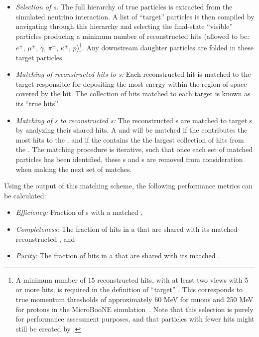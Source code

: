 \begin{itemize}
\item \textit{Selection of s:} The full hierarchy of true particles is extracted from the simulated neutrino interaction. A list of ``target'' particles is then compiled by navigating through this hierarchy and selecting the final-state ``visible'' particles producing a minimum number of reconstructed hits (allowed to be: $e^{\pm}$, $\mu^{\pm}$, $\gamma$, $\pi^{\pm}$, $\kappa^{\pm}$, $p$)\footnote{A minimum number of 15 reconstructed hits, with at least two views with 5 or more hits, is required in the definition of ``target'' . This  corresponds to true momentum thresholds of approximately 60 MeV for muons and 250 MeV for protons in the MicroBooNE simulation~\cite{Acciarri:2017hat}. Note that this selection is purely for performance assessment purposes, and that particles with fewer hits might still be created by .}. Any downstream daughter particles are folded in these target particles.
\item \textit{Matching of reconstructed \twod hits to s:} Each reconstructed \twod hit is matched to the target  responsible for depositing the most energy within the region of space covered by the hit. The collection of \twod hits matched to each target  is known as its ``true hits''.
\item \textit{Matching of s to reconstructed s:} The reconstructed s are matched to target s by analyzing their shared \twod hits. A  and  will be matched if the  contributes the most hits to the , and if the  contains the the largest collection of hits from the . The matching procedure is iterative, such that once each set of matched particles has been identified, these s and s are removed from consideration when making the next set of matches. 
\end{itemize}

Using the output of this matching scheme, the following performance metrics can be calculated:

\begin{itemize}
\item \textit{Efficiency:} Fraction of s with a matched ,
\item \textit{Completeness:} The fraction of \twod hits in a  that are shared with its matched reconstructed , and 
\item \textit{Purity:} The fraction of \twod hits in a  that are shared with its matched .
\end{itemize}

